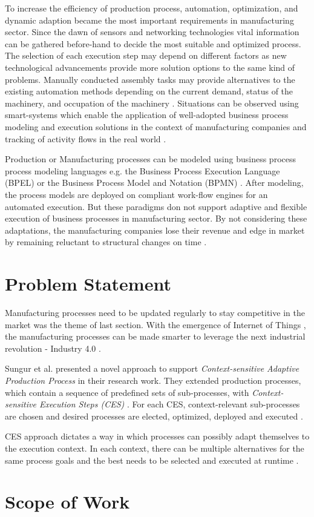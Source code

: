 To increase the efficiency of production process, automation, optimization, and dynamic adaption became the most important requirements in manufacturing sector. Since the dawn of sensors and networking technologies  vital information can be gathered before-hand to decide the most suitable and optimized process.  The selection of each execution step may depend on different factors as new technological advancements provide more solution options to the same kind of problems. Manually conducted assembly tasks may provide alternatives to the existing automation methods depending on the current demand, status of the machinery, and occupation of the machinery \cite{TIMURCIRP}. Situations can be observed using smart-systems  which enable the application of well-adopted business process modeling and execution  solutions in the context of manufacturing companies and tracking of activity flows in the real world \cite{CONWORKFLOW}.

Production or Manufacturing processes can be modeled using business process process modeling languages e.g. the Business Process Execution Language (\acs{BPEL}) \cite{BPELSPEC} or the Business Process Model and Notation (\acs{BPMN}) \cite{OMGSPEC}. After modeling, the process models are deployed on compliant work-flow engines for an automated execution. But these paradigms don not support adaptive and flexible execution of business processes in manufacturing sector. By not considering these adaptations, the manufacturing companies lose their revenue and edge in market by remaining reluctant to structural changes on time \cite{TIMURCIRP,CONWORKFLOW}.
\section{Problem Statement}
Manufacturing processes need to be updated regularly to stay competitive in the market was the theme of last section. With the emergence of Internet of Things , the manufacturing processes can be made smarter to leverage the next industrial revolution - Industry 4.0 .

Sungur et al. \cite{TIMURCIRP} presented a novel approach to support \textit{Context-sensitive Adaptive Production Process} in their research work. They extended production processes, which contain a sequence of predefined sets of sub-processes, with \textit{Context-sensitive Execution Steps (\acs{CES})} . For each \acs{CES}, context-relevant sub-processes are chosen and desired processes are elected, optimized, deployed and executed \cite{TIMURCIRP}.

\acs{CES} approach dictates a way in which processes can possibly adapt themselves to the execution context. In each context, there can be multiple alternatives for the same process goals and the best needs to be selected and executed at runtime \cite{TIMURCIRP}.
\section{Scope of Work}